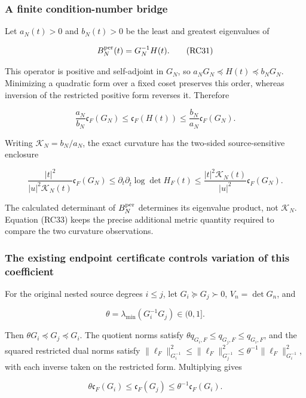 \subsubsection{A finite condition-number bridge}\label{endpoint-residue_original--a-finite-condition-number-bridge}

Let \(a_N(t)>0\) and \(b_N(t)>0\) be the least and greatest eigenvalues of

\[
B_N^{\rm per}(t)=G_N^{-1}H(t).
\tag{RC31}
\]

This operator is positive and self-adjoint in \(G_N\), so \(a_NG_N\preceq H(t)\preceq b_NG_N\). Minimizing a quadratic form over a fixed coset preserves this order, whereas inversion of the restricted positive form reverses it. Therefore

\[
\frac{a_N}{b_N}\mathfrak c_F(G_N)
\leq\mathfrak c_F(H(t))
\leq\frac{b_N}{a_N}\mathfrak c_F(G_N).
\tag{RC32}
\]

Writing \(\mathcal K_N=b_N/a_N\), the exact curvature has the two-sided source-sensitive enclosure

\[
\boxed{\frac{|t|^2}{|u|^2\mathcal K_N(t)}\mathfrak c_F(G_N)
\leq\partial_t\partial_{\bar t}\log\det H_F(t)
\leq\frac{|t|^2\mathcal K_N(t)}{|u|^2}\mathfrak c_F(G_N).}
\tag{RC33}
\]

The calculated determinant of \(B_N^{\rm per}\) determines its eigenvalue product, not \(\mathcal K_N\). Equation (RC33) keeps the precise additional metric quantity required to compare the two curvature observations.

\subsubsection{The existing endpoint certificate controls variation of this coefficient}\label{endpoint-residue_original--the-existing-endpoint-certificate-controls-variation-of-this-coefficient}

For the original nested source degrees \(i\leq j\), let \(G_i\succeq G_j\succ0\), \(V_n=\det G_n\), and

\[
\theta=\lambda_{\min}(G_i^{-1}G_j)\in(0,1].
\tag{RC34}
\]

Then \(\theta G_i\preceq G_j\preceq G_i\). The quotient norms satisfy \(\theta q_{G_i,F}\leq q_{G_j,F}\leq q_{G_i,F}\), and the squared restricted dual norms satisfy \(\|\ell_F\|_{G_i^{-1}}^2\leq\|\ell_F\|_{G_j^{-1}}^2
\leq\theta^{-1}\|\ell_F\|_{G_i^{-1}}^2\), with each inverse taken on the restricted form. Multiplying gives

\[
\theta\mathfrak c_F(G_i)\leq\mathfrak c_F(G_j)
\leq\theta^{-1}\mathfrak c_F(G_i).
\tag{RC35}
\]

